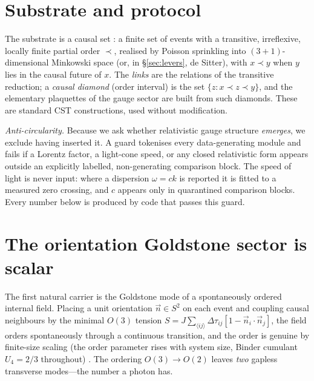 \documentclass[aps,prd,reprint,nofootinbib,superscriptaddress,floatfix]{revtex4-2}
\begin{document}
\section{Substrate and protocol}\label{sec:protocol}

The substrate is a causal set \cite{BLMS1987}: a finite set of events with a transitive,
irreflexive, locally finite partial order $\prec$, realised by Poisson sprinkling into
$(3{+}1)$-dimensional Minkowski space (or, in \S\ref{sec:levers}, de Sitter), with
$x\prec y$ when $y$ lies in the causal future of $x$. The \emph{links} are the relations
of the transitive reduction; a \emph{causal diamond} (order interval) is the set
$\{z: x\prec z\prec y\}$, and the elementary plaquettes of the gauge sector are built
from such diamonds. These are standard CST constructions, used without modification.

\emph{Anti-circularity.} Because we ask whether relativistic gauge structure
\emph{emerges}, we exclude having inserted it. A guard tokenises every data-generating
module and fails if a Lorentz factor, a light-cone speed, or any closed relativistic
form appears outside an explicitly labelled, non-generating comparison block. The speed
of light is never input: where a dispersion $\omega=ck$ is reported it is fitted to a
measured zero crossing, and $c$ appears only in quarantined comparison blocks. Every
number below is produced by code that passes this guard.

\section{The orientation Goldstone sector is scalar}\label{sec:goldstone}

The first natural carrier is the Goldstone mode of a spontaneously ordered internal
field. Placing a unit orientation $\vec n\in S^2$ on each event and coupling causal
neighbours by the minimal $O(3)$ tension
$S=J\sum_{\langle ij\rangle}\Delta\tau_{ij}[1-\vec n_i\!\cdot\!\vec n_j]$, the field
orders spontaneously through a continuous transition, and the order is genuine by
finite-size scaling (the order parameter rises with system size, Binder cumulant
$U_4=2/3$ throughout) \cite{GoldstonePRD}. The ordering $O(3)\to O(2)$ leaves
\emph{two} gapless transverse modes---the number a photon has.
\end{document}
